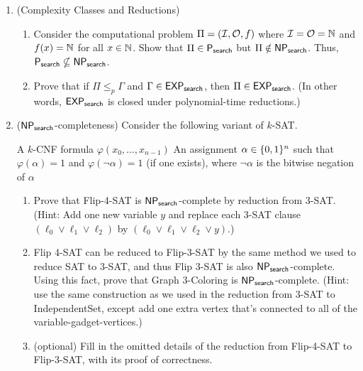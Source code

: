 \documentclass[11pt]{article}
\begin{document}
\begin{enumerate}
    \item (Complexity Classes and Reductions)  
    \begin{enumerate}
        \item Consider the computational problem $\Pi = (\mathcal{I},\mathcal{O},f)$ where $\mathcal{I}=\mathcal{O}=\mathbb{N}$ and $f(x)=\mathbb{N}$ for all $x\in \mathbb{N}$.  Show that $\Pi\in \mathsf{P_{search}}$ but $\Pi\notin \mathsf{NP_{search}}$.  Thus, $\mathsf{P_{search}}\nsubseteq\mathsf{NP_{search}}$.
        
        \item  Prove that if 
$\Pi\leq_p \Gamma$ and $\Gamma\in \mathsf{EXP_{search}}$, then $\Pi\in \mathsf{EXP_{search}}$. (In other words, $\mathsf{EXP_{search}}$ is closed under polynomial-time reductions.) 

    \end{enumerate}

    \item ($\mathsf{NP_{search}}$-completeness) Consider the following variant of $k$-SAT.
    
        {A $k$-CNF formula $\varphi(x_0,\ldots,x_{n-1})$}
        {An assignment $\alpha\in\{0,1\}^n$ such that $\varphi(\alpha)=1$ and $\varphi(\neg \alpha)=1$ (if one exists), where $\neg \alpha$ is the bitwise negation of $\alpha$}
        \begin{enumerate}
        \item Prove that Flip-4-SAT is $\mathsf{NP_{search}}$-complete by reduction from 3-SAT.  (Hint: Add one new variable $y$ and replace each 3-SAT clause $(\ell_0 \vee \ell_1 \vee \ell_2)$ by $(\ell_0 \vee \ell_1 \vee \ell_2 \vee y)$.)

        \item Flip 4-SAT can be reduced to Flip-3-SAT by the same method we used to reduce SAT to 3-SAT, and thus Flip 3-SAT is also $\mathsf{NP_{search}}$-complete.  Using this fact, 
        prove that Graph 3-Coloring is $\mathsf{NP_{search}}$-complete. (Hint: use the same construction as we used in the reduction from 3-SAT to IndependentSet, except add one extra vertex that's connected to all of the variable-gadget-vertices.)

        \item (optional) Fill in the omitted details of the reduction from Flip-4-SAT to Flip-3-SAT, with its proof of correctness.
        \end{enumerate}
        

\end{enumerate}
\end{document}
